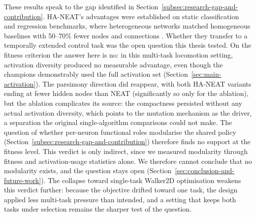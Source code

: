 \documentclass[12pt]{article}
\newcommand{\revPlain}[2]{#2}
\newcommand{\revBrit}[2]{#2}
\newcommand{\revTerm}[2]{#2}
\begin{document}
These results speak to the gap identified in Section~\ref{subsec:research-gap-and-contribution}.
HA-NEAT's advantages were established on static classification and regression benchmarks, where heterogeneous networks matched homogeneous baselines with 50--70\% fewer nodes and connections \parencite{hagg_evolving_2017}. Whether they transfer to a temporally extended control task was the open question this thesis tested.
On the fitness criterion the answer here is no: in this multi-task locomotion setting, activation diversity produced no measurable advantage, even though the champions demonstrably \revTerm{T-10}{used the full activation set} (Section~\ref{sec:main-activation}).
The parsimony direction did reappear, with both HA-NEAT variants ending at fewer hidden nodes than NEAT (significantly so only for the ablation), but the ablation complicates its source: the compactness persisted without any actual activation diversity, which points to the mutation mechanism as the driver, a separation the original single-algorithm comparisons could not make.
The question of whether per-neuron \revPlain{P-07}{functional roles} \revBrit{E-14}{modularise the shared policy} (Section~\ref{subsec:research-gap-and-contribution}) therefore finds no support at the fitness level.
This verdict is only indirect, since we measured modularity through fitness and activation-usage statistics alone. We therefore cannot conclude that no modularity exists, and the question stays open (Section~\ref{sec:conclusion-and-future-work}).
The collapse toward \revBrit{E-16}{single-task Walker2D optimisation} weakens this verdict further: because the objective drifted toward one task, the design applied less multi-task pressure than intended, and a setting that keeps both tasks under selection remains the sharper test of the question.
\end{document}
